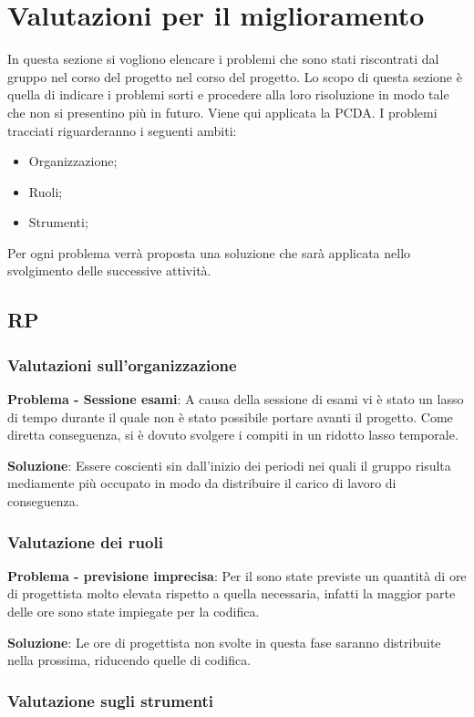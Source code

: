 \section{Valutazioni per il miglioramento}
In questa sezione si vogliono elencare i problemi che sono stati riscontrati dal gruppo nel corso del progetto nel corso del progetto. Lo scopo di questa sezione è quella di indicare i problemi sorti e procedere alla loro risoluzione in modo tale che non si presentino più in futuro. Viene qui applicata la PCDA.
I problemi tracciati riguarderanno i seguenti ambiti:
\begin{itemize}
\item Organizzazione;
\item Ruoli;
\item Strumenti;
\end{itemize}
Per ogni problema verrà proposta una soluzione che sarà applicata nello svolgimento delle successive attività.

\subsection{RP}
\subsubsection{Valutazioni sull'organizzazione}
\textbf{Problema - Sessione esami}: A causa della sessione di esami vi è stato un lasso di tempo durante il quale non è stato possibile portare avanti il progetto. Come diretta conseguenza, si è dovuto svolgere i compiti in un ridotto lasso temporale.

\textbf{Soluzione}: Essere coscienti sin dall'inizio dei periodi nei quali il gruppo risulta mediamente più occupato in modo da distribuire il carico di lavoro di conseguenza. 

\subsubsection{Valutazione dei ruoli}

\textbf{Problema - previsione imprecisa}: Per il  sono state previste un quantità di ore di progettista molto elevata rispetto a quella necessaria, infatti la maggior parte delle ore sono state impiegate per la codifica.

\textbf{Soluzione}: Le ore di progettista non svolte in questa fase saranno distribuite nella prossima, riducendo quelle di codifica.


\subsubsection{Valutazione sugli strumenti}

